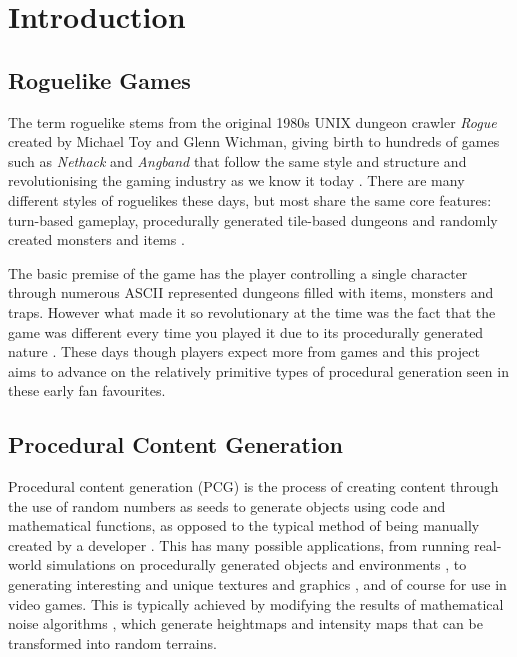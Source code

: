 \documentclass[12pt,a4paper]{article}
\begin{document}
\section{Introduction}
\subsection{Roguelike Games} \label{ssec:rogue}


The term roguelike stems from the original 1980s UNIX dungeon crawler \emph{Rogue} created by Michael Toy and Glenn Wichman, giving birth to hundreds of games such as \emph{Nethack} and \emph{Angband} that follow the same style and structure and revolutionising the gaming industry as we know it today \cite{Dunhack}. There are many different styles of roguelikes these days, but most share the same core features: turn-based gameplay, procedurally generated tile-based dungeons and randomly created monsters and items \cite{pgcbook}. 

The basic premise of the game has the player controlling a single character through numerous ASCII represented dungeons filled with items, monsters and traps. However what made it so revolutionary at the time was the fact that the game was different every time you played it due to its procedurally generated nature \cite{roguebasin}. These days though players expect more from games and this project aims to advance on the relatively primitive types of procedural generation seen in these early fan favourites.


\subsection{Procedural Content Generation} \label{ssec:PCG}

Procedural content generation (PCG) is the process of creating content through the use of random numbers as seeds to generate objects using code and mathematical functions, as opposed to the typical method of being manually created by a developer \cite{pgcbook}. This has many possible applications, from running real-world simulations on procedurally generated objects and environments \cite{vast}, to generating interesting and unique textures and graphics \cite{imagesynth}, and of course for use in video games. This is typically achieved by modifying the results of mathematical noise algorithms \cite{pgcbookch4}, which generate heightmaps and intensity maps that can be transformed into random terrains. \\
\end{document}
